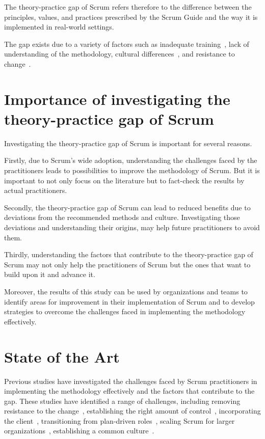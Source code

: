 The theory-practice gap of Scrum refers therefore to the difference between the \glspl{principle}, values, and practices prescribed by the Scrum Guide and the way it is implemented in real-world settings.

The gap exists due to a variety of factors such as inadequate training~\cite[p.~72]{Maximini2018ISi}, lack of understanding of the \gls{methodology}, cultural differences~\cite[pp.~27]{Koning2019AT}, and resistance to change~\cite[pp.~37--38]{Boehm2005Mct}.

\section{Importance of investigating the theory-practice gap of Scrum}\label{sec:ImportanceOfInvestigating}
Investigating the theory-practice gap of Scrum is important for several reasons. 

Firstly, due to Scrum's wide \gls{adoption}, understanding the challenges faced by the practitioners leads to possibilities to improve the \gls{methodology} of Scrum. But it is important to not only focus on the literature but to fact-check the results by actual practitioners.

Secondly, the theory-practice gap of Scrum can lead to reduced benefits due to deviations from the recommended \glspl{method} and culture. Investigating those deviations and understanding their origins, may help future practitioners to avoid them.

Thirdly, understanding the factors that contribute to the theory-practice gap of Scrum may not only help the practitioners of Scrum but the ones that want to build upon it and advance it.

Moreover, the results of this study can be used by organizations and teams to identify areas for improvement in their implementation of Scrum and to develop strategies to overcome the challenges faced in implementing the \gls{methodology} effectively.

\section{State of the Art}\label{sec:StateOfTheArt}
Previous studies have investigated the challenges faced by Scrum practitioners in implementing the \gls{methodology} effectively and the factors that contribute to the gap. These studies have identified a range of challenges, including removing resistance to the change~\cite[pp.~37--38]{Boehm2005Mct}, establishing the right amount of control~\cite[p.~4]{Verwijs2021Ato}, incorporating the client~\cite[p.~5]{Coyle2009Acs}, transitioning from \gls{plan-driven} roles~\cite[p.~16]{Moreira2013AtA}, scaling Scrum for larger organizations~\cite[pp.~124--126]{Maximini2018ISi}, establishing a common culture~\cite[p.~4]{Barroca2019Ata}.

